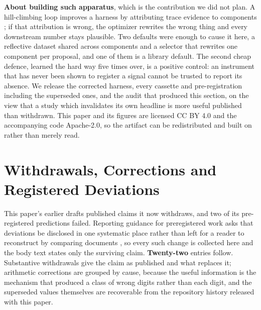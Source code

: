 \documentclass[11pt]{article}
\begin{document}
\textbf{About building such apparatus}, which is the contribution we did not plan. A
hill-climbing loop improves a harness by attributing trace evidence to components
\citep{langchain2026loopcraft}; if that attribution is wrong, the optimizer rewrites the wrong
thing and every downstream number stays plausible. Two defaults were enough to cause it here, a
reflective dataset shared across components and a selector that rewrites one component per
proposal, and one of them is a library default. The second cheap defence, learned the hard way
five times over, is a positive control: an instrument that has never been shown to register a
signal cannot be trusted to report its absence. We release the corrected harness, every cassette
and pre-registration including the superseded ones, and the audit that produced this section, on
the view that a study which invalidates its own headline is more useful published than withdrawn.
This paper and its figures are licensed CC BY 4.0 and the accompanying code Apache-2.0, so the
artifact can be redistributed and built on rather than merely read.





\appendix

\section{Withdrawals, Corrections and Registered Deviations}
\label{sec:corrections}

This paper's earlier drafts published claims it now withdraws, and two of its pre-registered
predictions failed. Reporting guidance for preregistered work asks that deviations be disclosed in
one systematic place rather than left for a reader to reconstruct by comparing documents
\citep{willroth2024bestlaid}, so every such change is collected here and the body text states only
the surviving claim. \textbf{Twenty-two} entries follow. Substantive withdrawals give the claim as
published and what replaces it; arithmetic corrections are grouped by cause, because the useful
information is the mechanism that produced a class of wrong digits rather than each digit, and the
superseded values themselves are recoverable from the repository history released with this paper.
\end{document}

